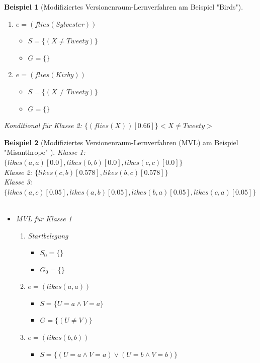 \documentclass[a4paper, 11pt]{book}
\newtheorem{Bsp}{Beispiel}[section]
\begin{document}
{\begin{Bsp}[Modifiziertes Versionenraum-Lernverfahren am Beispiel "{}Birds"{}]
\begin{enumerate}
	\begin{itemize}
		\item $ S = \{(X \neq Tweety)\}$ 
		\item $ G = \{\} $
	\end{itemize}
	\item $ e = (flies(Sylvester)) $
	\begin{itemize}
		\item $ S = \{(X \neq Tweety)\}$ 
		\item $ G = \{\} $
	\end{itemize}
		\item $ e = (flies(Kirby)) $
	\begin{itemize}
		\item $ S = \{(X \neq Tweety)\}$ 
		\item $ G = \{\} $
	\end{itemize}	
\end{enumerate}
Konditional für Klasse 2: $\{(flies(X))[0.66]\} <X \neq Tweety>$\\
\end{Bsp}
\begin{Bsp}[Modifiziertes Versionenraum-Lernverfahren (MVL) am Beispiel "{}Misanthrope"{} ]	
\noindent
Klasse 1: $ \{likes(a,a)[0.0], likes(b,b)[0.0], likes(c,c)[0.0]\} $\\
Klasse 2: $ \{likes(c,b)[0.578], likes(b,c)[0.578]\} $\\
Klasse 3: $ \{likes(a,c)[0.05], likes(a,b)[0.05], likes(b,a)[0.05], likes(c,a)[0.05]\} $\\
\\
\noindent
\begin{itemize}
	\item MVL für Klasse 1
	\begin{enumerate}
		\item Startbelegung
		\begin{itemize}
			\item $ S_0 = \{\}$ 
			\item $ G_0 = \{\} $
		\end{itemize}
		\item $ e = (likes(a,a)) $
		\begin{itemize}
			\item $ S = \{U = a \land V = a\}$ 
			\item $ G = \{(U \neq V)\} $
		\end{itemize}
		\item $ e = (likes(b,b)) $
		\begin{itemize}
			\item $ S = \{(U = a \land V = a) \lor (U = b \land V = b)\}$ 

\end{itemize}
\end{enumerate}
\end{itemize}
\end{Bsp}}
\end{document}
